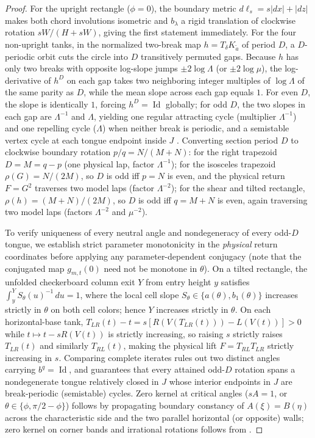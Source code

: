 \documentclass[11pt,reqno]{amsart}
\theoremstyle{definition}
\theoremstyle{remark}
\DeclareMathOperator{\Id}{Id}
\begin{document}
\begin{proof}
For the upright rectangle ($\phi = 0$), the boundary metric $d\ell_s = s|dx| + |dz|$ makes both chord involutions isometric and $b_\lambda$ a rigid translation of clockwise rotation $sW/(H+sW)$, giving the first statement immediately. For the four non-upright tanks, in the normalized two-break map $h = T_\delta K_{\tilde a}$ of period $D$, a $D$-periodic orbit cuts the circle into $D$ transitively permuted gaps. Because $h$ has only two breaks with opposite log-slope jumps $\pm 2\log\Lambda$ (or $\pm 2\log\mu$), the log-derivative of $h^D$ on each gap takes two neighboring integer multiples of $\log\Lambda$ of the same parity as $D$, while the mean slope across each gap equals $1$. For even $D$, the slope is identically $1$, forcing $h^D = \Id$ globally; for odd $D$, the two slopes in each gap are $\Lambda^{-1}$ and $\Lambda$, yielding one regular attracting cycle (multiplier $\Lambda^{-1}$) and one repelling cycle ($\Lambda$) when neither break is periodic, and a semistable vertex cycle at each tongue endpoint inside $J$ \cite[Prop.~3.1]{LBC2023}. Converting section period $D$ to clockwise boundary rotation $p/q = N/(M+N)$: for the right trapezoid $D = M = q - p$ (one physical lap, factor $\Lambda^{-1}$); for the isosceles trapezoid $\rho(G) = N/(2M)$, so $D$ is odd iff $p = N$ is even, and the physical return $F = G^2$ traverses two model laps (factor $\Lambda^{-2}$); for the shear and tilted rectangle, $\rho(h) = (M+N)/(2M)$, so $D$ is odd iff $q = M+N$ is even, again traversing two model laps (factors $\Lambda^{-2}$ and $\mu^{-2}$).

To verify uniqueness of every neutral angle and nondegeneracy of every odd-$D$ tongue, we establish strict parameter monotonicity in the \emph{physical} return coordinates before applying any parameter-dependent conjugacy (note that the conjugated map $g_{m,t}(0)$ need not be monotone in $\theta$). On a tilted rectangle, the unfolded checkerboard column exit $Y$ from entry height $y$ satisfies $\int_y^Y S_\theta(u)^{-1}\,du = 1$, where the local cell slope $S_\theta \in \{a(\theta), b_1(\theta)\}$ increases strictly in $\theta$ on both cell colors; hence $Y$ increases strictly in $\theta$. On each horizontal-base tank, $T_{LR}(t) - t = s[R(V(T_{LR}(t))) - L(V(t))] > 0$ while $t \mapsto t - sR(V(t))$ is strictly increasing, so raising $s$ strictly raises $T_{LR}(t)$ and similarly $T_{RL}(t)$, making the physical lift $F = T_{RL}T_{LR}$ strictly increasing in $s$. Comparing complete iterates rules out two distinct angles carrying $b^q = \Id$, and guarantees that every attained odd-$D$ rotation spans a nondegenerate tongue relatively closed in $J$ whose interior endpoints in $J$ are break-periodic (semistable) cycles. Zero kernel at critical angles ($sA = 1$, or $\theta \in \{\phi, \pi/2-\phi\}$) follows by propagating boundary constancy of $A(\xi) = B(\eta)$ across the characteristic side and the two parallel horizontal (or opposite) walls; zero kernel on corner bands and irrational rotations follows from \cite[Thms.~2.2--2.3]{Paper1}.
\end{proof}
\end{document}
